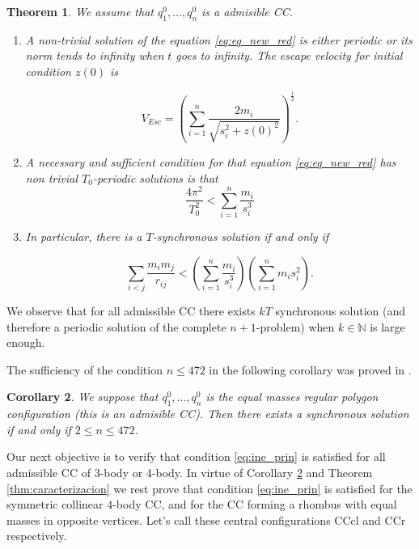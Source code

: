 \documentclass[twoside]{article}
\newtheorem{thm}{Theorem}[section]
\newtheorem{cor}[thm]{Corollary}
\theoremstyle{remark}
\begin{document}
\begin{thm}\label{thm:prin_ine} We assume that $q_1^0,\ldots,q_n^0$ is a admisible CC.
\begin{enumerate}
 \item\label{1} A non-trivial solution of the equation \eqref{eq:eq_new_red} is either periodic or  its norm tends to infinity when $t$ goes to infinity. The escape velocity for initial condition $z(0)$ is

 \begin{equation}\label{eq:vel.esc}
 V_{Esc}=\left(\sum_{i=1}^{n}\frac{2m_i}{\sqrt{s_i^2+z(0)^2}}\right)^{\frac12}.
 \end{equation}

 \item\label{2} A necessary and sufficient condition for that equation \eqref{eq:eq_new_red} has non trivial $T_0$-periodic solutions is that
\begin{equation}\label{eq:ine_T0-per-cond}
 \frac{4\pi^2}{T_0^2}<\sum_{i=1}^n\frac{m_i}{s_i^3}
\end{equation}
\item\label{3} In particular, there is a $T$-synchronous solution if and only if

\begin{equation}\label{eq:ine_prin}
 \sum_{i<j}\frac{m_im_j}{r_{ij}}<\left(\sum_{i=1}^n\frac{m_i}{s_i^3}\right)\left(\sum_{i=1}^nm_is_i^2\right).
\end{equation}
\end{enumerate}

\end{thm}

We observe that for all admissible CC there exists $kT$ synchronous solution (and therefore a periodic solution of the complete $n+1$-problem) when $k\in \mathbb{N}$ is  large enough.

The sufficiency of the condition $n\leq 472$ in the following corollary  was proved in \cite{li2013characterization}.

\begin{cor}\label{cor:nleq472}
We suppose that $q_1^0,\ldots,q_n^0$ is the equal masses regular polygon configuration  (this is an admisible CC). Then there exists a synchronous solution if and only if $2\leq n\leq 472$.
\end{cor}




Our next objective is to verify that condition \eqref{eq:ine_prin} is satisfied for all admissible CC of 3-body or 4-body. In virtue of Corollary \ref{cor:nleq472} and Theorem \ref{thm:caracterizacion}  we rest prove that condition \eqref{eq:ine_prin} is satisfied for the symmetric collinear $4$-body CC, and for the CC forming a rhombus with equal masses in opposite vertices. Let's call these central configurations CCcl and CCr respectively.
\end{document}
